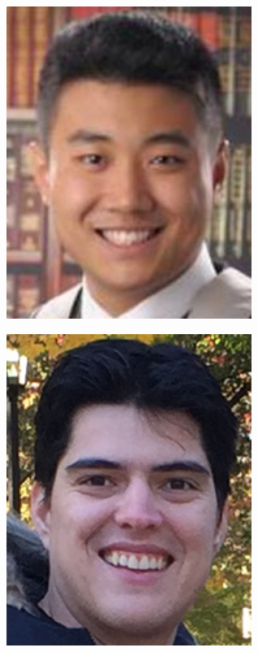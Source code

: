 \documentclass[landscape,a0b,final,a4resizeable]{include/a0poster}
\begin{document}
\begin{poster}
\begin{multicols}{3}
\vspace{1.5cm}
 \begin{center}
\begin{minipage}[c]{0.2\columnwidth}
  \includegraphics[width=8cm]{photos/xu}
  \captionsetup{labelformat=empty}
\end{minipage}
\hspace{0.5cm}
\begin{minipage}[c]{0.2\columnwidth}
  \includegraphics[width=8cm]{photos/acuna}
  \captionsetup{labelformat=empty}
\end{minipage}
\hspace{0.5cm}
\begin{minipage}[c]{0.2\columnwidth}

\end{minipage}
\end{center}
\end{multicols}
\end{poster}
\end{document}
